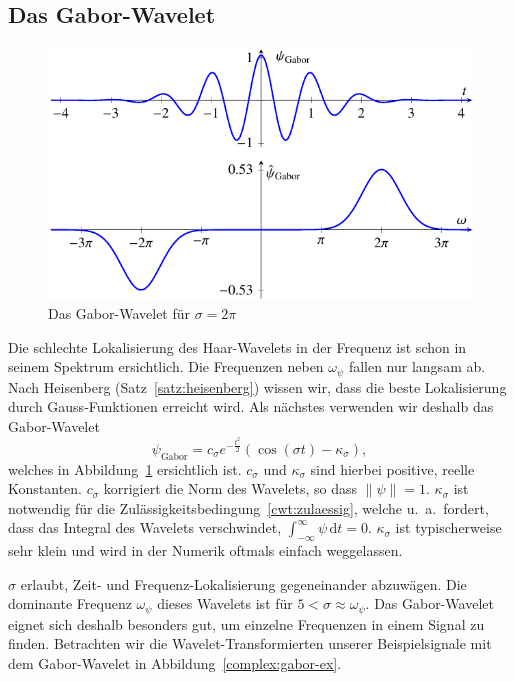 \subsection{Das Gabor-Wavelet}
\begin{figure}
	\centering
	\includegraphics{papers/complex/images/gabor.pdf}
	\caption{Das Gabor-Wavelet für $\sigma = 2\pi$ \label{complex:gabor}}
\end{figure}

Die schlechte Lokalisierung des Haar-Wavelets in der Frequenz ist schon in seinem Spektrum ersichtlich.
Die Frequenzen neben $\omega_\psi$ fallen nur langsam ab.
Nach Heisenberg (Satz~\ref{satz:heisenberg}) wissen wir, dass die beste Lokalisierung durch Gauss-Funktionen erreicht wird.
Als nächstes verwenden wir deshalb das Gabor-Wavelet
\[
	\psi_\text{Gabor} = c_\sigma e^{-\frac{t^2}{2}}\left(\cos\left(\sigma t\right) - \kappa_\sigma\right),
\]
welches in Abbildung~\ref{complex:gabor} ersichtlich ist.
$c_\sigma$ und $\kappa_\sigma$ sind hierbei positive, reelle Konstanten.
$c_\sigma$ korrigiert die Norm des Wavelets, so dass $\|\psi\| = 1$.
$\kappa_\sigma$ ist notwendig für die Zulässigkeitsbedingung~\eqref{cwt:zulaessig}, welche u.~a.~fordert, dass das Integral des Wavelets verschwindet,  $\int_{-\infty}^{\infty}\psi\,\mathrm{d}t = 0$.
$\kappa_\sigma$ ist typischerweise sehr klein und wird in der Numerik oftmals einfach weggelassen.

$\sigma$ erlaubt, Zeit- und Frequenz-Lokalisierung gegeneinander abzuwägen.
Die dominante Frequenz $\omega_\psi$ dieses Wavelets ist für $5 < \sigma \approx \omega_\psi$.
Das Gabor-Wavelet eignet sich deshalb besonders gut, um einzelne Frequenzen in einem Signal zu finden.
Betrachten wir die Wavelet-Transformierten unserer Beispielsignale mit dem Gabor-Wavelet in Abbildung~\ref{complex:gabor-ex}.

